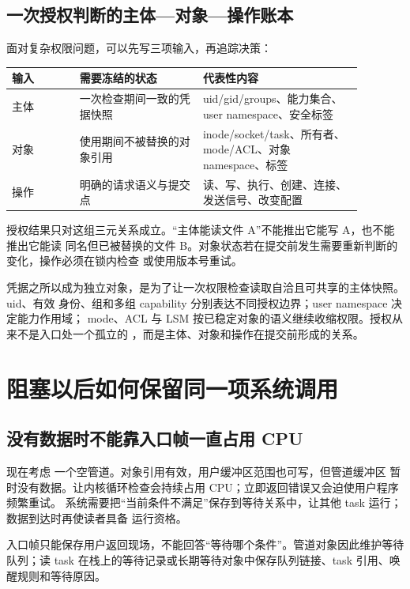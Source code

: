 \subsection{一次授权判断的主体—对象—操作账本}

面对复杂权限问题，可以先写三项输入，再追踪决策：

\begin{longtable}{|L{0.17\linewidth}|L{0.31\linewidth}|L{0.40\linewidth}|}
\hline
输入 & 需要冻结的状态 & 代表性内容 \\ \hline
主体 & 一次检查期间一致的凭据快照 & uid/gid/groups、能力集合、user namespace、安全标签 \\ \hline
对象 & 使用期间不被替换的对象引用 & inode/socket/task、所有者、mode/ACL、对象 namespace、标签 \\ \hline
操作 & 明确的请求语义与提交点 & 读、写、执行、创建、连接、发送信号、改变配置 \\ \hline
\end{longtable}

授权结果只对这组三元关系成立。“主体能读文件 A”不能推出它能写 A，也不能推出它能读
同名但已被替换的文件 B。对象状态若在提交前发生需要重新判断的变化，操作必须在锁内检查
或使用版本号重试。

\begin{keyidea}
凭据之所以成为独立对象，是为了让一次权限检查读取自洽且可共享的主体快照。uid、有效
身份、组和多组 capability 分别表达不同授权边界；user namespace 决定能力作用域；
mode、ACL 与 LSM 按已稳定对象的语义继续收缩权限。授权从来不是入口处一个孤立的
，而是主体、对象和操作在提交前形成的关系。
\end{keyidea}

\section{阻塞以后如何保留同一项系统调用}

\subsection{没有数据时不能靠入口帧一直占用 CPU}

现在考虑  一个空管道。对象引用有效，用户缓冲区范围也可写，但管道缓冲区
暂时没有数据。让内核循环检查会持续占用 CPU；立即返回错误又会迫使用户程序频繁重试。
系统需要把“当前条件不满足”保存到等待关系中，让其他 task 运行；数据到达时再使读者具备
运行资格。

入口帧只能保存用户返回现场，不能回答“等待哪个条件”。管道对象因此维护等待队列；读
task 在栈上的等待记录或长期等待对象中保存队列链接、task 引用、唤醒规则和等待原因。

